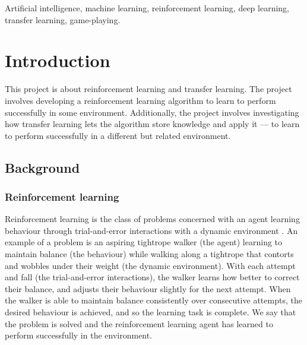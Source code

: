 \documentclass[12pt,a4paper]{article}
\begin{document}
\begin{keywords}
Artificial intelligence, machine learning, reinforcement learning, deep learning, transfer learning, game-playing.
\end{keywords}

\newpage
\section{Introduction}
This project is about reinforcement learning and transfer learning. The project involves developing a reinforcement learning algorithm to learn to perform successfully in some environment. Additionally, the project involves investigating how transfer learning lets the algorithm store knowledge and apply it --- to learn to perform successfully in a different but related environment.  

\subsection{Background} 
\subsubsection{Reinforcement learning}
Reinforcement learning is the class of problems concerned with an agent learning behaviour through trial-and-error interactions with a dynamic environment \cite{Kaelbling1996}. An example of a problem is an aspiring tightrope walker (the agent) learning to maintain balance (the behaviour) while walking along a tightrope that contorts and wobbles under their weight (the dynamic environment). With each attempt and fall (the trial-and-error interactions), the walker learns how better to correct their balance, and adjusts their behaviour slightly for the next attempt. When the walker is able to maintain balance consistently over consecutive attempts, the desired behaviour is achieved, and so the learning task is complete. We say that the problem is solved and the reinforcement learning agent has learned to perform successfully in the environment.  
\end{document}
